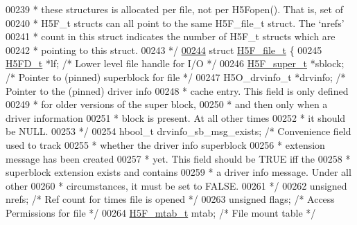 \begin{DoxyCode}
00239 \textcolor{comment}{ * these structures is allocated per file, not per H5Fopen(). That is, set of}
00240 \textcolor{comment}{ * H5F\_t structs can all point to the same H5F\_file\_t struct. The `nrefs'}
00241 \textcolor{comment}{ * count in this struct indicates the number of H5F\_t structs which are}
00242 \textcolor{comment}{ * pointing to this struct.}
00243 \textcolor{comment}{ */}
\hyperlink{struct_h5_f__file__t}{00244} \textcolor{keyword}{struct }\hyperlink{struct_h5_f__file__t}{H5F\_file\_t} \{
00245     \hyperlink{struct_h5_f_d__t}{H5FD\_t}    *lf;        \textcolor{comment}{/* Lower level file handle for I/O  */}
00246     \hyperlink{struct_h5_f__super__t}{H5F\_super\_t} *sblock;        \textcolor{comment}{/* Pointer to (pinned) superblock for file */}
00247     H5O\_drvinfo\_t *drvinfo; \textcolor{comment}{/* Pointer to the (pinned) driver info }
00248 \textcolor{comment}{                                 * cache entry.  This field is only defined}
00249 \textcolor{comment}{                                 * for older versions of the super block,}
00250 \textcolor{comment}{                                 * and then only when a driver information}
00251 \textcolor{comment}{                                 * block is present.  At all other times}
00252 \textcolor{comment}{                                 * it should be NULL.}
00253 \textcolor{comment}{                                 */}
00254     hbool\_t drvinfo\_sb\_msg\_exists;  \textcolor{comment}{/* Convenience field used to track }
00255 \textcolor{comment}{                                     * whether the driver info superblock }
00256 \textcolor{comment}{                                     * extension message has been created }
00257 \textcolor{comment}{                                     * yet. This field should be TRUE iff the}
00258 \textcolor{comment}{                                     * superblock extension exists and contains}
00259 \textcolor{comment}{                                     * a driver info message.  Under all other}
00260 \textcolor{comment}{                                     * circumstances, it must be set to FALSE.}
00261 \textcolor{comment}{                                     */}
00262     \textcolor{keywordtype}{unsigned}    nrefs;      \textcolor{comment}{/* Ref count for times file is opened   */}
00263     \textcolor{keywordtype}{unsigned}    flags;      \textcolor{comment}{/* Access Permissions for file          */}
00264     \hyperlink{struct_h5_f__mtab__t}{H5F\_mtab\_t}    mtab;       \textcolor{comment}{/* File mount table                     */}

\end{DoxyCode}
